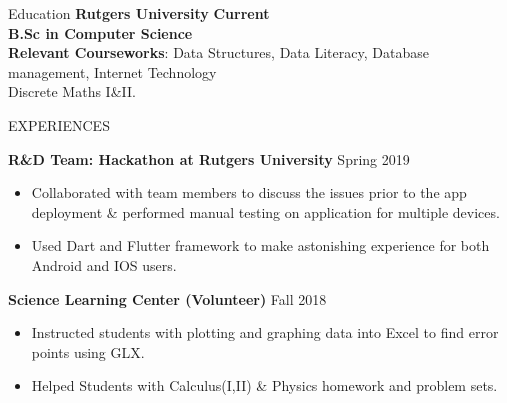 \documentclass{resume}
\begin{document}

\begin{rSection}{Education}
{\bf Rutgers University}  \hfill {\bf Current}\\
{\bf B.Sc in Computer Science}\\
{ \bf Relevant Courseworks}: Data Structures, Data Literacy, Database management, Internet Technology\\
Discrete Maths I\&II.
\end{rSection}

\begin{rSection}{EXPERIENCES}


\textbf{R\&D Team: Hackathon at Rutgers University} \hfill Spring 2019
 \begin{itemize}
    \itemsep -2pt {} 
     \item Collaborated with team members to discuss the issues prior to the app deployment  \& performed manual testing on application for multiple devices.
     \item Used Dart and  Flutter framework to make astonishing experience for both Android and IOS users.
 \end{itemize}
 
\textbf{Science Learning Center (Volunteer)} \hfill Fall 2018
 \begin{itemize}
    \itemsep -2pt {} 
     \item Instructed students with plotting and graphing data into Excel to find error points using GLX.
     \item Helped Students with Calculus(I,II) \& Physics homework and problem sets.
 \end{itemize}
\end{rSection} 

\end{document}
